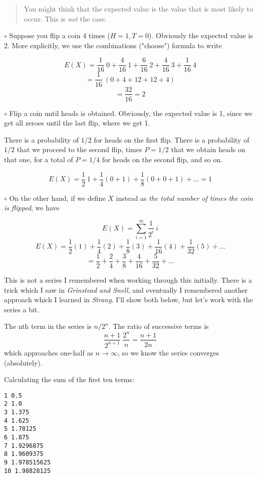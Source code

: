 \documentclass[11pt, oneside]{article}
\begin{document}
\begin{quote}\color{blue}You might think that the expected value is the value that is most likely to occur.  This is \emph{not} the case.\color{black}\end{quote}

$\circ$ Suppose you flip a coin 4 times ($H = 1, T = 0$).  Obviously the expected value is 2.  More explicitly, we use the combinations ("choose") formula to write

\[ E(X) = \frac{1}{16} \ 0 + \frac{4}{16} \ 1 + \frac{6}{16} \ 2 + \frac{4}{16} \ 3 + \frac{1}{16} \ 4 \]
\[ = \frac{1}{16} \ (0 + 4 + 12 + 12 + 4) \]
\[ = \frac{32}{16} = 2 \]

$\circ$ Flip a coin until heads is obtained.  Obviously, the expected value is 1, since we get all zeroes until the last flip, where we get 1. 

There is a probability of $1/2$ for heads on the first flip.  There is a probability of $1/2$ that we proceed to the second flip, times $P=1/2$ that we obtain heads on that one, for a total of $P = 1/4$ for heads on the second flip, and so on.

\[ E(X) = \frac{1}{2} \ 1 + \frac{1}{4} (0 + 1) +  \frac{1}{8}(0 + 0 + 1) + \dots = 1 \]

$\circ$ On the other hand, if we define $X$ instead as \emph{the total number of times the coin is flipped}, we have

\[ E(X) = \sum_{i=1}^{\infty} \frac{1}{2^i} \ i \]
\[ E(X) = \frac{1}{2} (1) + \frac{1}{4} (2) +  \frac{1}{8}(3) +  \frac{1}{16}(4) +  \frac{1}{32}(5) + \dots \]
\[ = \frac{1}{2} + \frac{2}{4} + \frac{3}{8} + \frac{4}{16} + \frac{5}{32} + \dots \]

This is not a series I remembered when working through this initially.  There is a trick which I saw in \emph{Grinstead and Snell}, and eventually I remembered another approach which I learned in \emph{Strang}. I'll show both below, but let's work with the series a bit.

The nth term in the series is $n/2^n$.  The ratio of successive terms is
\[ \frac{n+1}{2^{n+1}} \ \frac{2^n}{n} = \frac{n+1}{2n} \]
which approaches one-half as $n \rightarrow \infty$, so we know the series converges (absolutely).

Calculating the sum of the first ten terms:

\begin{verbatim}
1 0.5
2 1.0
3 1.375
4 1.625
5 1.78125
6 1.875
7 1.9296875
8 1.9609375
9 1.978515625
10 1.98828125
\end{verbatim}
\end{document}
